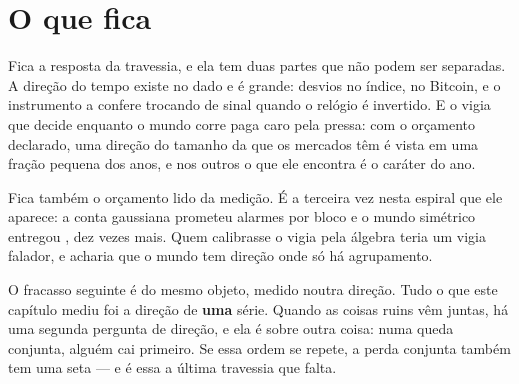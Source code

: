 \section{O que fica}

Fica a resposta da travessia, e ela tem duas partes que não podem ser separadas. A direção do tempo
existe no dado e é grande: \numDirecaoIndiceRazao{} desvios no índice, \numDirecaoBitcoinRazao{} no
Bitcoin, e o instrumento a confere trocando de sinal quando o relógio é invertido. E o vigia que
decide enquanto o mundo corre paga caro pela pressa: com o orçamento declarado, uma direção do tamanho
da que os mercados têm é vista em uma fração pequena dos anos, e nos outros o que ele encontra é o
caráter do ano.

Fica também o orçamento lido da medição. É a terceira vez nesta espiral que ele aparece: a conta
gaussiana prometeu \numDirecaoContaTaxa{} alarmes por bloco e o mundo simétrico entregou
\numDirecaoNuloTaxa{}, dez vezes mais. Quem calibrasse o vigia pela álgebra teria um vigia falador, e
acharia que o mundo tem direção onde só há agrupamento.

O fracasso seguinte é do mesmo objeto, medido noutra direção. Tudo o que este capítulo mediu foi a
direção de \textbf{uma} série. Quando as coisas ruins vêm juntas, há uma segunda pergunta de direção, e ela é sobre outra
coisa: numa queda conjunta, alguém cai primeiro. Se essa ordem se
repete, a perda conjunta também tem uma seta --- e é essa a última travessia que falta.
